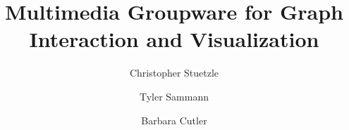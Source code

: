 \documentclass[runningheads,a4paper]{llncs}
\begin{document}
\mainmatter  %

\title{
%
Multimedia Groupware for Graph \\ Interaction and Visualization\\
\vspace{-0.1in}
%
}

\titlerunning{ }

%
%
\author{ 
Christopher Stuetzle
\and Tyler Sammann
\and Barbara Cutler }
%
\authorrunning{}


\institute{
\mailsa \hspace{0.1in}
\mailsb \hspace{0.1in}
\mailsc 
\vspace{-0.2in}
}

%
%

\toctitle{ }
\tocauthor{}
\maketitle
\end{document}

